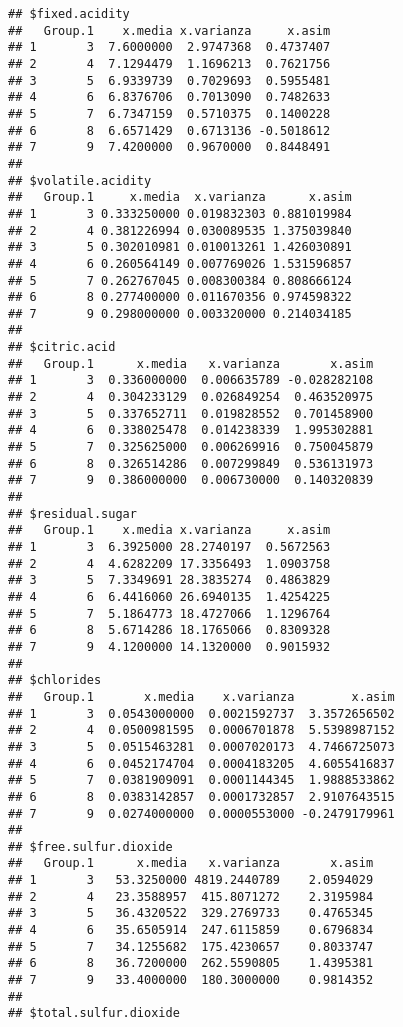 \documentclass[
]{article}
\begin{document}
\begin{verbatim}
## $fixed.acidity
##   Group.1    x.media x.varianza     x.asim
## 1       3  7.6000000  2.9747368  0.4737407
## 2       4  7.1294479  1.1696213  0.7621756
## 3       5  6.9339739  0.7029693  0.5955481
## 4       6  6.8376706  0.7013090  0.7482633
## 5       7  6.7347159  0.5710375  0.1400228
## 6       8  6.6571429  0.6713136 -0.5018612
## 7       9  7.4200000  0.9670000  0.8448491
## 
## $volatile.acidity
##   Group.1     x.media  x.varianza      x.asim
## 1       3 0.333250000 0.019832303 0.881019984
## 2       4 0.381226994 0.030089535 1.375039840
## 3       5 0.302010981 0.010013261 1.426030891
## 4       6 0.260564149 0.007769026 1.531596857
## 5       7 0.262767045 0.008300384 0.808666124
## 6       8 0.277400000 0.011670356 0.974598322
## 7       9 0.298000000 0.003320000 0.214034185
## 
## $citric.acid
##   Group.1      x.media   x.varianza       x.asim
## 1       3  0.336000000  0.006635789 -0.028282108
## 2       4  0.304233129  0.026849254  0.463520975
## 3       5  0.337652711  0.019828552  0.701458900
## 4       6  0.338025478  0.014238339  1.995302881
## 5       7  0.325625000  0.006269916  0.750045879
## 6       8  0.326514286  0.007299849  0.536131973
## 7       9  0.386000000  0.006730000  0.140320839
## 
## $residual.sugar
##   Group.1    x.media x.varianza     x.asim
## 1       3  6.3925000 28.2740197  0.5672563
## 2       4  4.6282209 17.3356493  1.0903758
## 3       5  7.3349691 28.3835274  0.4863829
## 4       6  6.4416060 26.6940135  1.4254225
## 5       7  5.1864773 18.4727066  1.1296764
## 6       8  5.6714286 18.1765066  0.8309328
## 7       9  4.1200000 14.1320000  0.9015932
## 
## $chlorides
##   Group.1       x.media    x.varianza        x.asim
## 1       3  0.0543000000  0.0021592737  3.3572656502
## 2       4  0.0500981595  0.0006701878  5.5398987152
## 3       5  0.0515463281  0.0007020173  4.7466725073
## 4       6  0.0452174704  0.0004183205  4.6055416837
## 5       7  0.0381909091  0.0001144345  1.9888533862
## 6       8  0.0383142857  0.0001732857  2.9107643515
## 7       9  0.0274000000  0.0000553000 -0.2479179961
## 
## $free.sulfur.dioxide
##   Group.1      x.media   x.varianza       x.asim
## 1       3   53.3250000 4819.2440789    2.0594029
## 2       4   23.3588957  415.8071272    2.3195984
## 3       5   36.4320522  329.2769733    0.4765345
## 4       6   35.6505914  247.6115859    0.6796834
## 5       7   34.1255682  175.4230657    0.8033747
## 6       8   36.7200000  262.5590805    1.4395381
## 7       9   33.4000000  180.3000000    0.9814352
## 
## $total.sulfur.dioxide

\end{verbatim}
\end{document}
